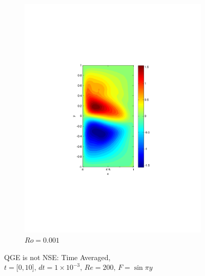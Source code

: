 \begin{figure}
\begin{center}
\begin{subfigure}{0.3\textwidth}
    \includegraphics[scale=0.5]{Figures/Re200Ro1E-3h16k1000}
    \caption{$Ro=0.001$}
    \label{sfi:QGERo0.001}
  \end{subfigure}
  \caption{QGE is not NSE: Time Averaged, $t=\lbrack 0, 10\rbrack,\, dt=1\times
    10^{-3},\, Re= 200,\, F = \sin \pi y$}
  \label{fig:NSEnotQGE}
  \end{center}
\end{figure}

